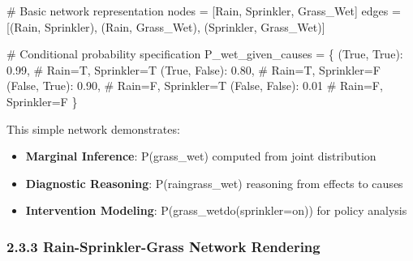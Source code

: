 \documentclass[
  11pt,
  letterpaper,
  openany]{book}
\newenvironment{Shaded}{\begin{snugshade}}{\end{snugshade}}
\newcommand{\CommentTok}[1]{\textcolor[rgb]{0.37,0.37,0.37}{#1}}
\newcommand{\FloatTok}[1]{\textcolor[rgb]{0.68,0.00,0.00}{#1}}
\newcommand{\NormalTok}[1]{\textcolor[rgb]{0.00,0.23,0.31}{#1}}
\newcommand{\OperatorTok}[1]{\textcolor[rgb]{0.37,0.37,0.37}{#1}}
\newcommand{\StringTok}[1]{\textcolor[rgb]{0.13,0.47,0.30}{#1}}
\newcommand{\VariableTok}[1]{\textcolor[rgb]{0.07,0.07,0.07}{#1}}
\providecommand{\tightlist}{%
  \setlength{\itemsep}{0pt}\setlength{\parskip}{0pt}}
\begin{document}
\begin{Shaded}
\begin{Highlighting}[]
\CommentTok{\# Basic network representation}
\NormalTok{nodes }\OperatorTok{=}\NormalTok{ [}\StringTok{\textquotesingle{}Rain\textquotesingle{}}\NormalTok{, }\StringTok{\textquotesingle{}Sprinkler\textquotesingle{}}\NormalTok{, }\StringTok{\textquotesingle{}Grass\_Wet\textquotesingle{}}\NormalTok{]}
\NormalTok{edges }\OperatorTok{=}\NormalTok{ [(}\StringTok{\textquotesingle{}Rain\textquotesingle{}}\NormalTok{, }\StringTok{\textquotesingle{}Sprinkler\textquotesingle{}}\NormalTok{), (}\StringTok{\textquotesingle{}Rain\textquotesingle{}}\NormalTok{, }\StringTok{\textquotesingle{}Grass\_Wet\textquotesingle{}}\NormalTok{), (}\StringTok{\textquotesingle{}Sprinkler\textquotesingle{}}\NormalTok{, }\StringTok{\textquotesingle{}Grass\_Wet\textquotesingle{}}\NormalTok{)]}

\CommentTok{\# Conditional probability specification}
\NormalTok{P\_wet\_given\_causes }\OperatorTok{=}\NormalTok{ \{}
\NormalTok{    (}\VariableTok{True}\NormalTok{, }\VariableTok{True}\NormalTok{): }\FloatTok{0.99}\NormalTok{,    }\CommentTok{\# Rain=T, Sprinkler=T}
\NormalTok{    (}\VariableTok{True}\NormalTok{, }\VariableTok{False}\NormalTok{): }\FloatTok{0.80}\NormalTok{,   }\CommentTok{\# Rain=T, Sprinkler=F  }
\NormalTok{    (}\VariableTok{False}\NormalTok{, }\VariableTok{True}\NormalTok{): }\FloatTok{0.90}\NormalTok{,   }\CommentTok{\# Rain=F, Sprinkler=T}
\NormalTok{    (}\VariableTok{False}\NormalTok{, }\VariableTok{False}\NormalTok{): }\FloatTok{0.01}   \CommentTok{\# Rain=F, Sprinkler=F}
\NormalTok{\}}
\end{Highlighting}
\end{Shaded}

This simple network demonstrates:

\begin{itemize}
\tightlist
\item
  \textbf{Marginal Inference}: P(grass\_wet) computed from joint
  distribution
\item
  \textbf{Diagnostic Reasoning}: P(rain\textbar grass\_wet) reasoning
  from effects to causes
\item
  \textbf{Intervention Modeling}: P(grass\_wet\textbar do(sprinkler=on))
  for policy analysis
\end{itemize}

\subsubsection{2.3.3 Rain-Sprinkler-Grass Network
Rendering}\label{rain-sprinkler-grass-network-rendering}
\end{document}

